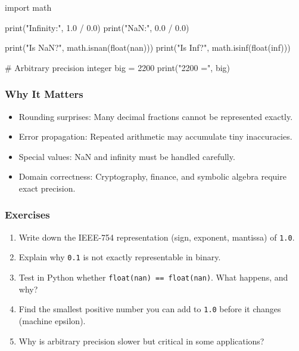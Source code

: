\documentclass[
  letterpaper,
  DIV=11,
  numbers=noendperiod]{scrreprt}
\newenvironment{Shaded}{\begin{snugshade}}{\end{snugshade}}
\newcommand{\BuiltInTok}[1]{\textcolor[rgb]{0.00,0.23,0.31}{#1}}
\newcommand{\CommentTok}[1]{\textcolor[rgb]{0.37,0.37,0.37}{#1}}
\newcommand{\DecValTok}[1]{\textcolor[rgb]{0.68,0.00,0.00}{#1}}
\newcommand{\FloatTok}[1]{\textcolor[rgb]{0.68,0.00,0.00}{#1}}
\newcommand{\ImportTok}[1]{\textcolor[rgb]{0.00,0.46,0.62}{#1}}
\newcommand{\NormalTok}[1]{\textcolor[rgb]{0.00,0.23,0.31}{#1}}
\newcommand{\OperatorTok}[1]{\textcolor[rgb]{0.37,0.37,0.37}{#1}}
\newcommand{\StringTok}[1]{\textcolor[rgb]{0.13,0.47,0.30}{#1}}
\providecommand{\tightlist}{%
  \setlength{\itemsep}{0pt}\setlength{\parskip}{0pt}}
\begin{document}
\begin{Shaded}
\begin{Highlighting}[]
\ImportTok{import}\NormalTok{ math}

\BuiltInTok{print}\NormalTok{(}\StringTok{"Infinity:"}\NormalTok{, }\FloatTok{1.0} \OperatorTok{/} \FloatTok{0.0}\NormalTok{)}
\BuiltInTok{print}\NormalTok{(}\StringTok{"NaN:"}\NormalTok{, }\FloatTok{0.0} \OperatorTok{/} \FloatTok{0.0}\NormalTok{)}

\BuiltInTok{print}\NormalTok{(}\StringTok{"Is NaN?"}\NormalTok{, math.isnan(}\BuiltInTok{float}\NormalTok{(}\StringTok{\textquotesingle{}nan\textquotesingle{}}\NormalTok{)))}
\BuiltInTok{print}\NormalTok{(}\StringTok{"Is Inf?"}\NormalTok{, math.isinf(}\BuiltInTok{float}\NormalTok{(}\StringTok{\textquotesingle{}inf\textquotesingle{}}\NormalTok{)))}

\CommentTok{\# Arbitrary precision integer}
\NormalTok{big }\OperatorTok{=} \DecValTok{2200}
\BuiltInTok{print}\NormalTok{(}\StringTok{"2200 ="}\NormalTok{, big)}
\end{Highlighting}
\end{Shaded}

\subsubsection{Why It Matters}\label{why-it-matters-2}

\begin{itemize}
\tightlist
\item
  Rounding surprises: Many decimal fractions cannot be represented
  exactly.
\item
  Error propagation: Repeated arithmetic may accumulate tiny
  inaccuracies.
\item
  Special values: NaN and infinity must be handled carefully.
\item
  Domain correctness: Cryptography, finance, and symbolic algebra
  require exact precision.
\end{itemize}

\subsubsection{Exercises}\label{exercises-2}

\begin{enumerate}
\def\labelenumi{\arabic{enumi}.}
\tightlist
\item
  Write down the IEEE-754 representation (sign, exponent, mantissa) of
  \texttt{1.0}.
\item
  Explain why \texttt{0.1} is not exactly representable in binary.
\item
  Test in Python whether
  \texttt{float(\textquotesingle{}nan\textquotesingle{})\ ==\ float(\textquotesingle{}nan\textquotesingle{})}.
  What happens, and why?
\item
  Find the smallest positive number you can add to \texttt{1.0} before
  it changes (machine epsilon).
\item
  Why is arbitrary precision slower but critical in some applications?
\end{enumerate}
\end{document}
